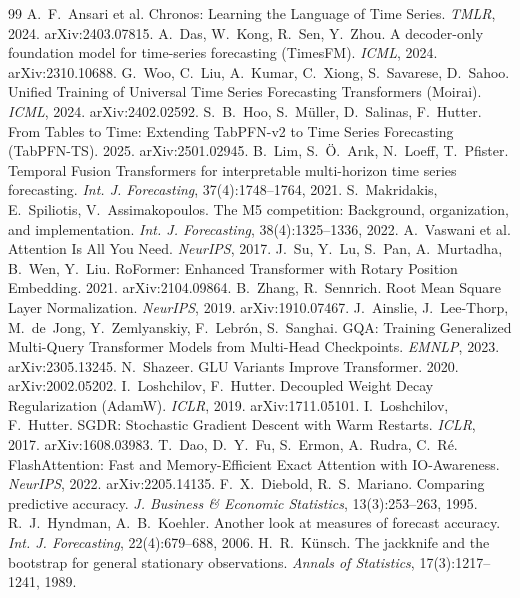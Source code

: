 \documentclass[11pt]{article}
\begin{document}
\begin{thebibliography}{99}
 A.~F.~Ansari et al. Chronos: Learning the Language of Time Series.
\emph{TMLR}, 2024. arXiv:2403.07815.
 A.~Das, W.~Kong, R.~Sen, Y.~Zhou. A decoder-only foundation model for
time-series forecasting (TimesFM). \emph{ICML}, 2024. arXiv:2310.10688.
 G.~Woo, C.~Liu, A.~Kumar, C.~Xiong, S.~Savarese, D.~Sahoo. Unified Training
of Universal Time Series Forecasting Transformers (Moirai). \emph{ICML}, 2024. arXiv:2402.02592.
 S.~B.~Hoo, S.~M\"uller, D.~Salinas, F.~Hutter. From Tables to Time:
Extending TabPFN-v2 to Time Series Forecasting (TabPFN-TS). 2025. arXiv:2501.02945.
 B.~Lim, S.~\"O.~Ar\i k, N.~Loeff, T.~Pfister. Temporal Fusion Transformers for
interpretable multi-horizon time series forecasting. \emph{Int. J. Forecasting},
37(4):1748--1764, 2021.
 S.~Makridakis, E.~Spiliotis, V.~Assimakopoulos. The M5 competition: Background,
organization, and implementation. \emph{Int. J. Forecasting}, 38(4):1325--1336, 2022.
 A.~Vaswani et al. Attention Is All You Need. \emph{NeurIPS}, 2017.
 J.~Su, Y.~Lu, S.~Pan, A.~Murtadha, B.~Wen, Y.~Liu. RoFormer: Enhanced
Transformer with Rotary Position Embedding. 2021. arXiv:2104.09864.
 B.~Zhang, R.~Sennrich. Root Mean Square Layer Normalization. \emph{NeurIPS},
2019. arXiv:1910.07467.
 J.~Ainslie, J.~Lee-Thorp, M.~de~Jong, Y.~Zemlyanskiy, F.~Lebr\'on, S.~Sanghai.
GQA: Training Generalized Multi-Query Transformer Models from Multi-Head Checkpoints.
\emph{EMNLP}, 2023. arXiv:2305.13245.
 N.~Shazeer. GLU Variants Improve Transformer. 2020. arXiv:2002.05202.
 I.~Loshchilov, F.~Hutter. Decoupled Weight Decay Regularization (AdamW).
\emph{ICLR}, 2019. arXiv:1711.05101.
 I.~Loshchilov, F.~Hutter. SGDR: Stochastic Gradient Descent with Warm Restarts.
\emph{ICLR}, 2017. arXiv:1608.03983.
 T.~Dao, D.~Y.~Fu, S.~Ermon, A.~Rudra, C.~R\'e. FlashAttention: Fast and
Memory-Efficient Exact Attention with IO-Awareness. \emph{NeurIPS}, 2022. arXiv:2205.14135.
 F.~X.~Diebold, R.~S.~Mariano. Comparing predictive accuracy. \emph{J. Business
\& Economic Statistics}, 13(3):253--263, 1995.
 R.~J.~Hyndman, A.~B.~Koehler. Another look at measures of forecast accuracy.
\emph{Int. J. Forecasting}, 22(4):679--688, 2006.
 H.~R.~K\"unsch. The jackknife and the bootstrap for general stationary
observations. \emph{Annals of Statistics}, 17(3):1217--1241, 1989.
\end{thebibliography}
\end{document}

